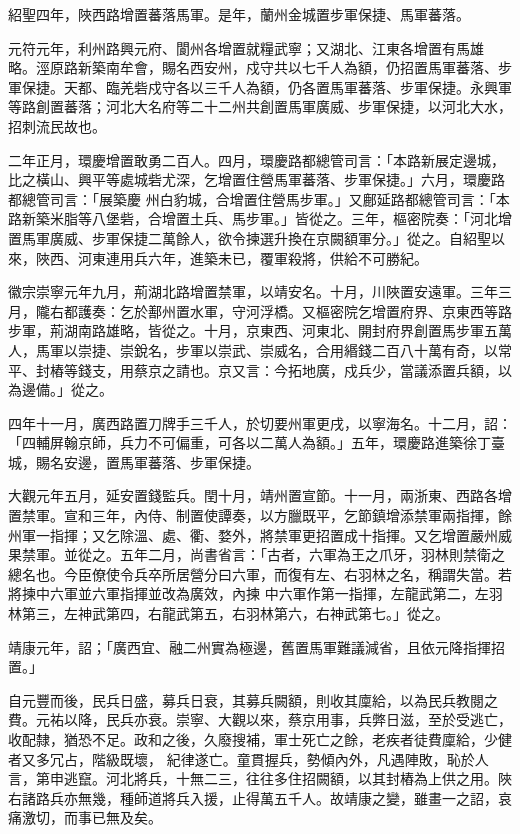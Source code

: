 \begin{pinyinscope}
 紹聖四年，陜西路增置蕃落馬軍。是年，蘭州金城置步軍保捷、馬軍蕃落。



 元符元年，利州路興元府、閬州各增置就糧武寧；又湖北、江東各增置有馬雄
 略。涇原路新築南牟會，賜名西安州，戍守共以七千人為額，仍招置馬軍蕃落、步軍保捷。天都、臨羌砦戍守各以三千人為額，仍各置馬軍蕃落、步軍保捷。永興軍等路創置蕃落；河北大名府等二十二州共創置馬軍廣威、步軍保捷，以河北大水，招刺流民故也。



 二年正月，環慶增置敢勇二百人。四月，環慶路都總管司言：「本路新展定邊城，比之橫山、興平等處城砦尤深，乞增置住營馬軍蕃落、步軍保捷。」六月，環慶路都總管司言：「展築慶
 州白豹城，合增置住營馬步軍。」又鄜延路都總管司言：「本路新築米脂等八堡砦，合增置土兵、馬步軍。」皆從之。三年，樞密院奏：「河北增置馬軍廣威、步軍保捷二萬餘人，欲令揀選升換在京闕額軍分。」從之。自紹聖以來，陜西、河東連用兵六年，進築未已，覆軍殺將，供給不可勝紀。



 徽宗崇寧元年九月，荊湖北路增置禁軍，以靖安名。十月，川陜置安遠軍。三年三月，隴右都護奏：乞於鄯州置水軍，守河浮橋。又樞密院乞增置府界、京東西等路
 步軍，荊湖南路雄略，皆從之。十月，京東西、河東北、開封府界創置馬步軍五萬人，馬軍以崇捷、崇銳名，步軍以崇武、崇威名，合用緡錢二百八十萬有奇，以常平、封樁等錢支，用蔡京之請也。京又言：今拓地廣，戍兵少，當議添置兵額，以為邊備。」從之。



 四年十一月，廣西路置刀牌手三千人，於切要州軍更戌，以寧海名。十二月，詔：「四輔屏翰京師，兵力不可偏重，可各以二萬人為額。」五年，環慶路進築徐丁臺城，賜名安邊，置馬軍蕃落、步軍保捷。



 大觀元年五月，延安置錢監兵。閏十月，靖州置宣節。十一月，兩浙東、西路各增置禁軍。宣和三年，內侍、制置使譚奏，以方臘既平，乞節鎮增添禁軍兩指揮，餘州軍一指揮；又乞除溫、處、衢、婺外，將禁軍更招置成十指揮。又乞增置嚴州威果禁軍。並從之。五年二月，尚書省言：「古者，六軍為王之爪牙，羽林則禁衛之總名也。今臣僚使令兵卒所居營分曰六軍，而復有左、右羽林之名，稱謂失當。若將揀中六軍並六軍指揮並改為廣效，內揀
 中六軍作第一指揮，左龍武第二，左羽林第三，左神武第四，右龍武第五，右羽林第六，右神武第七。」從之。



 靖康元年，詔；「廣西宜、融二州實為極邊，舊置馬軍難議減省，且依元降指揮招置。」



 自元豐而後，民兵日盛，募兵日衰，其募兵闕額，則收其廩給，以為民兵教閱之費。元祐以降，民兵亦衰。崇寧、大觀以來，蔡京用事，兵弊日滋，至於受逃亡，收配隸，猶恐不足。政和之後，久廢搜補，軍士死亡之餘，老疾者徒費廩給，少健者又多冗占，階級既壞，
 紀律遂亡。童貫握兵，勢傾內外，凡遇陣敗，恥於人言，第申逃竄。河北將兵，十無二三，往往多住招闕額，以其封樁為上供之用。陜右諸路兵亦無幾，種師道將兵入援，止得萬五千人。故靖康之變，雖畫一之詔，哀痛激切，而事已無及矣。




\end{pinyinscope}
